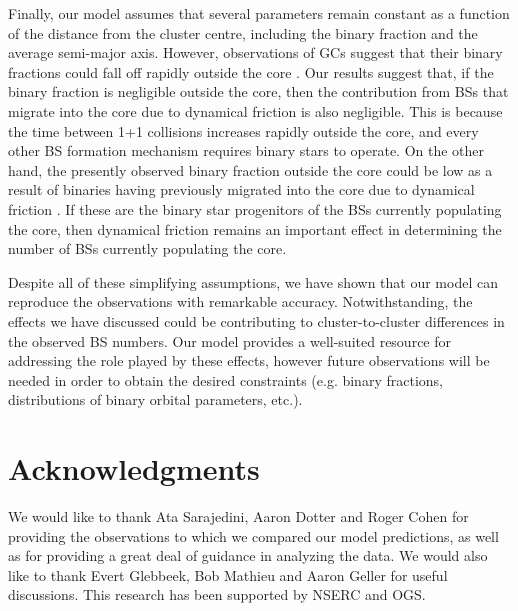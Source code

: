 Finally, our model 
assumes that several parameters remain constant as a function of
the distance from the cluster centre, including the binary fraction
and the average 
semi-major axis.  However, observations of GCs suggest that their
binary fractions could fall off rapidly outside the core
\citep[e.g.][]{sollima07, davis08}.  Our results suggest that, if the
binary fraction is negligible outside the core, then the contribution
from BSs that migrate into the core due to dynamical friction is also
negligible.  This is because the time between 1+1 collisions increases
rapidly outside the core, and every other BS formation mechanism requires
binary stars to operate.  On the other hand, the presently observed
binary fraction outside the core could be low as a result of binaries
having previously migrated into the core due to dynamical friction
\citep[e.g.][]{fregeau09}.  If these are the binary star progenitors
of the BSs currently populating the core, then dynamical friction
remains an important effect in determining the number of BSs
currently populating the core. 

Despite all of these 
simplifying assumptions, we have shown that our model can reproduce the 
observations with remarkable accuracy.  Notwithstanding, the effects
we have discussed 
could be contributing to cluster-to-cluster differences in the
observed BS numbers.  Our model provides a well-suited resource for
addressing the role played by these effects, however future
observations will be needed in order to obtain the desired constraints
(e.g. binary fractions, distributions of binary orbital parameters, etc.).   

\section*{Acknowledgments}

We would like to thank Ata Sarajedini, Aaron Dotter and Roger Cohen
for providing the observations to which we compared our model
predictions, as well as for providing a great deal of guidance in 
analyzing the data.  We would also like to thank Evert Glebbeek, Bob Mathieu
and Aaron Geller for useful discussions.  This research has been
supported by NSERC and OGS. 


